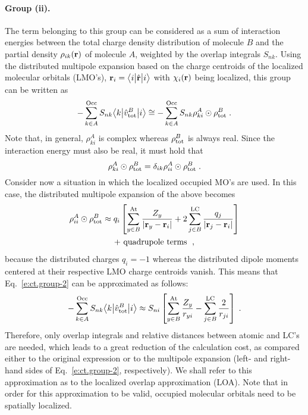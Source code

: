 \documentclass[aip,jcp,amsmath,amssymb,reprint,floatfix]{revtex4-1}
\begin{document}
\paragraph{Group (ii).}
The term belonging to this group can be considered as a sum of interaction
energies between the total charge density distribution of molecule $B$
and the partial density $\rho_{ik}({\bf r})$ of molecule $A$,
weighted by the overlap integrals $S_{nk}$. Using the distributed multipole 
expansion based on the charge centroids of the localized molecular orbitals (LMO's),
${\bf r}_i = \bigl\langle {i} \bigl\lvert {\hat{\bf r}} \bigl\lvert {i} \bigr\rangle$ with $\chi_i({\bf r})$ being localized,
this group can be written as
%
\begin{equation} \label{e:ct.group-2}
      - \sum_{k\in A}^{\rm Occ} S_{nk}  \bigl\langle {k} \bigl\lvert {\hat{v}^B_{\rm tot} } \bigl\lvert {i} \bigr\rangle 
 \cong - \sum_{k\in A}^{\rm Occ} S_{nk} \rho_{ki}^A \odot \rho^B_{\rm tot} \;.
\end{equation}
%
Note that, in general, $\rho_{ki}^A$ is complex whereas $\rho^B_{\rm tot}$ is always real.
Since the interaction energy must also be real, it must hold that
%
\begin{equation} \label{e:ct.group-2-d}
 \rho_{ki}^A \odot \rho^B_{\rm tot} = \delta_{ik} \rho_{ii}^A \odot \rho^B_{\rm tot} \;.
\end{equation}
%
Consider now a situation in which the localized occupied MO's are used.
In this case, the distributed multipole expansion
of the above becomes
%
\begin{multline}
 \rho_{ii}^A \odot \rho^B_{\rm tot} 
 \approx 
 q_{i} 
 \left[
 \sum_{y\in B}^{\rm At}
  \frac{Z_y}{\vert {\bf r}_y - {\bf r}_i \vert } 
 +
 2\sum_{j\in B}^{\rm LC}
  \frac{q_j}{\vert {\bf r}_j - {\bf r}_i \vert } 
 \right] \\
 + \text{ quadrupole terms } \;,
\end{multline}
%
because the distributed charges
$q_i = -1$ whereas the distributed dipole moments %
centered at their
respective LMO charge centroids vanish.\cite{Etchebest.Lavery.Pullman.TheorChimActa.1982}
This means that Eq.~\eqref{e:ct.group-2} can be approximated as follows:
%
\begin{equation} \label{e:ct.group-ii.final}
      - \sum_{k\in A}^{\rm Occ} S_{nk} \bigl\langle {k} \bigl\lvert {\hat{v}^B_{\rm tot} } \bigl\lvert {i} \bigr\rangle 
 \approx S_{ni}  \left[
 \sum_{y\in B}^{\rm At}
  \frac{Z_y}{ r_{yi} } 
 -
 \sum_{j\in B}^{\rm LC}
  \frac{2}{r_{ji}} 
 \right] \;.
\end{equation}
%
Therefore, only overlap integrals and relative distances between
atomic and LC's are needed, which leads to a great reduction of the
calculation cost,
as compared either to the original expression or to the multipole expansion (left\hyp{} and right\hyp{}hand sides
of Eq.~\eqref{e:ct.group-2}, respectively).
We shall refer to this approximation as to
the localized overlap approximation (LOA). Note that in order for this approximation to be valid,
occupied molecular orbitals need to be spatially localized.
\end{document}
